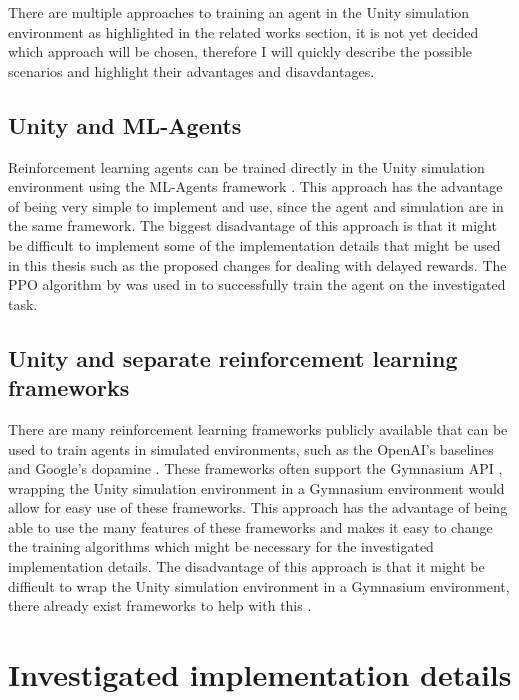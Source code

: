 There are multiple approaches to training an agent in the Unity simulation environment as highlighted in the related works section, it is not yet decided which approach will be chosen, therefore I will quickly describe the possible scenarios and highlight their advantages and disavdantages.

\subsection*{Unity and ML-Agents}

Reinforcement learning agents can be trained directly in the Unity simulation environment using the ML-Agents framework \autocite{mlagents}. This approach has the advantage of being very simple to implement and use, since the agent and simulation are in the same framework. The biggest disadvantage of this approach is that it might be difficult to implement some of the implementation details that might be used in this thesis such as the proposed changes for dealing with delayed rewards.
The PPO algorithm by \autocite{mlagents} was used in \autocite{maximilian} to successfully train the agent on the investigated task.

\subsection*{Unity and separate reinforcement learning frameworks}

There are many reinforcement learning frameworks publicly available that can be used to train agents in simulated environments, such as the OpenAI's baselines \autocite{sb3} and Google's dopamine \autocite{dopamine}. These frameworks often support the Gymnasium API \autocite{gymnasium}, wrapping the Unity simulation environment in a Gymnasium environment would allow for easy use of these frameworks. This approach has the advantage of being able to use the many features of these frameworks and makes it easy to change the training algorithms which might be necessary for the investigated implementation details. The disadvantage of this approach is that it might be difficult to wrap the Unity simulation environment in a Gymnasium environment, there already exist frameworks to help with this \autocite{peacefulpie}.




\section{Investigated implementation details}

